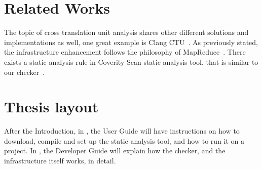 \section{Related Works}

The topic of cross translation unit analysis shares other different solutions and implementations as well, one great example is
Clang CTU~\cite{clangCTU}.
As previously stated, the infrastructure enhancement follows the philosophy of MapReduce~\cite{mapreduce}.
There exists a static analysis rule in Coverity Scan static analysis tool, that is similar to our checker~\cite{coverity}.


\section{Thesis layout}

After the Introduction, in , the User Guide will have instructions on how to download, compile and set up the
static analysis tool, and how to run it on a \CC{} project. In , the Developer Guide will explain how the
checker, and the infrastructure itself works, in detail.
